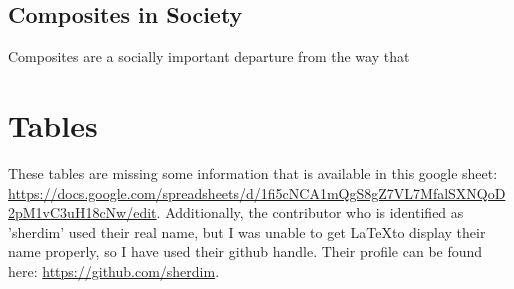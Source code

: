 \documentclass[a4paper,man,natbib,floatsintext]{apa6}
\begin{document}


  \subsection{Composites in Society}
  Composites are a socially important departure from the way that 

  

   \singlespacing
   \printnoidxglossaries


   \section{Tables}
   These tables are missing some information that is available in this google sheet: \url{https://docs.google.com/spreadsheets/d/1fi5cNCA1mQgS8gZ7VL7MfalSXNQoD2pM1vC3uH18cNw/edit}. Additionally, the contributor who is identified as 'sherdim' used their real name, but I was unable to get \LaTeX to display their name properly, so I have used their github handle. Their profile can be found here: \url{https://github.com/sherdim}.
\end{document}
